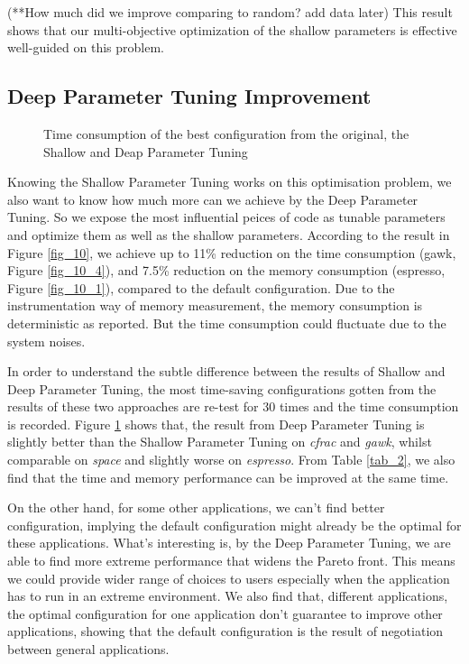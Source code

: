 (**How much did we improve comparing to random? add data later) This result shows that our multi-objective optimization of the shallow parameters is effective well-guided on this problem.

\subsection{Deep Parameter Tuning Improvement}

\begin{figure}[htbp]
	\centering
	\caption{Time consumption of the best configuration from the original, the Shallow and Deap Parameter Tuning}\label{fig_sig}
\end{figure}

Knowing the Shallow Parameter Tuning works on this optimisation problem, we also want to know how much more can we achieve by the Deep Parameter Tuning. So we expose the most influential peices of code as tunable parameters and optimize them as well as the shallow parameters. According to the result in Figure \ref{fig_10}, we achieve up to 11\% reduction on the time consumption (gawk, Figure \ref{fig_10_4}), and 7.5\% reduction on the memory consumption (espresso, Figure \ref{fig_10_1}), compared to the default configuration. Due to the instrumentation way of memory measurement, the memory consumption is deterministic as reported. But the time consumption could fluctuate due to the system noises. 

In order to understand the subtle difference between the results of Shallow and Deep Parameter Tuning, the most time-saving configurations gotten from the results of these two approaches are re-test for 30 times and the time consumption is recorded. Figure \ref{fig_sig} shows that, the result from Deep Parameter Tuning is slightly better than the Shallow Parameter Tuning on \emph{cfrac} and \emph{gawk}, whilst comparable on \emph{space} and slightly worse on \emph{espresso}. From Table \ref{tab_2}, we also find that the time and memory performance can be improved at the same time. 

On the other hand, for some other applications, we can't find better configuration, implying the default configuration might already be the optimal for these applications. What's interesting is, by the Deep Parameter Tuning, we are able to find more extreme performance that widens the Pareto front. This means we could provide wider range of choices to users especially when the application has to run in an extreme environment. We also find that, different applications, the optimal configuration for one application don't guarantee to improve other applications, showing that the default configuration is the result of negotiation between general applications.

